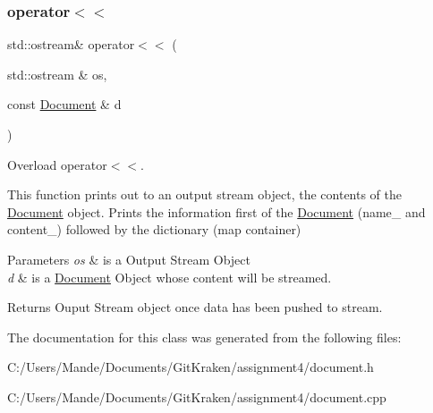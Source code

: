 \subsubsection{\texorpdfstring{operator$<$$<$}{operator<<}\hspace{0.1cm}{\footnotesize\ttfamily [4/4]}}
{\footnotesize\ttfamily std\+::ostream\& operator$<$$<$ (\begin{DoxyParamCaption}\item[{std\+::ostream \&}]{os,  }\item[{const \hyperlink{class_document}{Document} \&}]{d }\end{DoxyParamCaption})\hspace{0.3cm}{\ttfamily [friend]}}



Overload operator$<$$<$. 

This function prints out to an output stream object, the contents of the \hyperlink{class_document}{Document} object. Prints the information first of the \hyperlink{class_document}{Document} (name\+\_\+ and content\+\_\+) followed by the dictionary (map container)


\begin{DoxyParams}{Parameters}
{\em os} & is a Output Stream Object \\
\hline
{\em d} & is a \hyperlink{class_document}{Document} Object whose content will be streamed. \\
\hline
\end{DoxyParams}
\begin{DoxyReturn}{Returns}
Ouput Stream object once data has been pushed to stream. 
\end{DoxyReturn}


The documentation for this class was generated from the following files\+:\begin{DoxyCompactItemize}
\item 
C\+:/\+Users/\+Mande/\+Documents/\+Git\+Kraken/assignment4/document.\+h\item 
C\+:/\+Users/\+Mande/\+Documents/\+Git\+Kraken/assignment4/document.\+cpp\end{DoxyCompactItemize}
